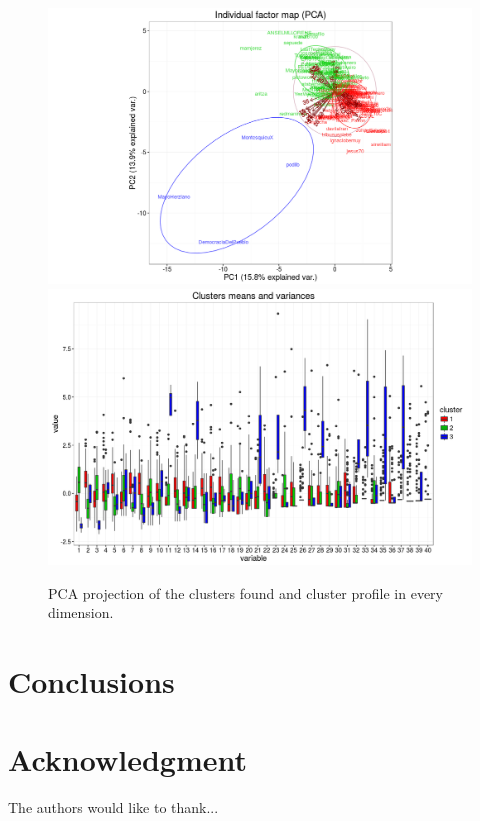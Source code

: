 \documentclass[conference]{IEEEtran}
\begin{document}
\begin{figure}
	\centering
	\includegraphics[width=1\textwidth]{PCA_clustering_3_4_order}
	\includegraphics[width=1\textwidth]{clustering_3_4_order}
	\caption{PCA projection of the clusters found and cluster profile in every dimension.}
	\label{fig:PCA}
\end{figure}


\section{Conclusions}

\section*{Acknowledgment}


The authors would like to thank...
\end{document}

